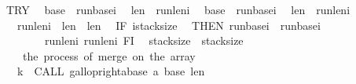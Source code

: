 \begin{isabellebody}
{\isachardoublequoteopen}\isanewline
TRY\isanewline
\ \ {\isasymacute}base{}\ {\isacharcolon}{\isacharequal}{\isacharequal}\ {\isasymacute}run{\isacharunderscore}base{\isacharbang}{\isasymacute}i{\isacharsemicolon}{\isacharsemicolon}\isanewline
\ \ {\isasymacute}len{}\ {\isacharcolon}{\isacharequal}{\isacharequal}\ {\isasymacute}run{\isacharunderscore}len{\isacharbang}{\isasymacute}i{\isacharsemicolon}{\isacharsemicolon}\isanewline
\ \ {\isasymacute}base{}\ {\isacharcolon}{\isacharequal}{\isacharequal}\ {\isasymacute}run{\isacharunderscore}base{\isacharbang}{\isacharparenleft}{\isasymacute}i{\isacharplus}{}{\isacharparenright}{\isacharsemicolon}{\isacharsemicolon}\isanewline
\ \ {\isasymacute}len{}\ {\isacharcolon}{\isacharequal}{\isacharequal}\ {\isasymacute}run{\isacharunderscore}len{\isacharbang}{\isacharparenleft}{\isasymacute}i{\isacharplus}{}{\isacharparenright}{\isacharsemicolon}{\isacharsemicolon}\isanewline
\ \ {\isacharparenleft}{\isasymacute}run{\isacharunderscore}len{\isacharbang}{\isasymacute}i{\isacharparenright}\ {\isacharcolon}{\isacharequal}{\isacharequal}\ {\isasymacute}len{}\ {\isacharplus}\ {\isasymacute}len{}{\isacharsemicolon}{\isacharsemicolon}\isanewline
\ \ IF\ {\isasymacute}i{\isacharequal}{\isasymacute}stack{\isacharunderscore}size{\isacharminus}{}\isanewline
\ \ THEN\ {\isasymacute}run{\isacharunderscore}base{\isacharbang}{\isacharparenleft}{\isasymacute}i{\isacharplus}{}{\isacharparenright}\ {\isacharcolon}{\isacharequal}{\isacharequal}\ {\isasymacute}run{\isacharunderscore}base{\isacharbang}{\isacharparenleft}{\isasymacute}i{\isacharplus}{}{\isacharparenright}{\isacharsemicolon}{\isacharsemicolon}\isanewline
\ \ \ \ \ \ \ {\isasymacute}run{\isacharunderscore}len{\isacharbang}{\isacharparenleft}{\isasymacute}i{\isacharplus}{}{\isacharparenright}\ {\isacharcolon}{\isacharequal}{\isacharequal}{\isacharparenleft}{\isasymacute}run{\isacharunderscore}len{\isacharbang}{\isacharparenleft}{\isasymacute}i{\isacharplus}{}{\isacharparenright}{\isacharparenright}\ FI{\isacharsemicolon}{\isacharsemicolon}\isanewline
\ \ {\isasymacute}stack{\isacharunderscore}size\ {\isacharcolon}{\isacharequal}{\isacharequal}\ {\isasymacute}stack{\isacharunderscore}size{\isacharminus}{}\ {\isacharsemicolon}{\isacharsemicolon}\isanewline
\ \ {\isacharparenleft}{\isacharasterisk}\ the\ process\ of\ merge\ on\ the\ array\ {\isacharasterisk}{\isacharparenright}\isanewline
\ \ {\isasymacute}k\ {\isacharcolon}{\isacharequal}{\isacharequal}\ CALL\ gallop{\isacharunderscore}right{\isacharparenleft}{\isasymacute}a{\isacharbang}{\isasymacute}base{}{\isacharcomma}\ {\isasymacute}a{\isacharcomma}\ {\isasymacute}base{}{\isacharcomma}\ {\isasymacute}len{}{\isacharcomma}\ {}{\isacharparenright}{\isacharsemicolon}{\isacharsemicolon}\isanewline

\end{isabellebody}
